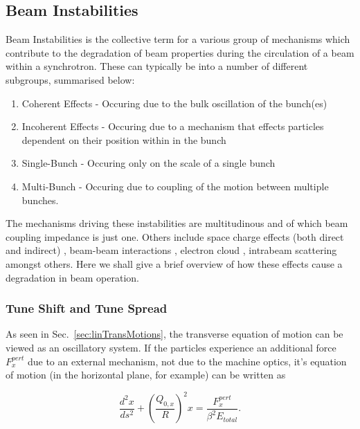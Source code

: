 \subsection{Beam Instabilities}

Beam Instabilities is the collective term for a various group of mechanisms which contribute to the degradation of beam properties during the circulation of a beam within a synchrotron. These can typically be into a number of different subgroups, summarised below:

\begin{enumerate}
\item{Coherent Effects - Occuring due to the bulk oscillation of the bunch(es)}
\item{Incoherent Effects - Occuring due to a mechanism that effects particles dependent on their position within in the bunch}
\item{Single-Bunch - Occuring only on the scale of a single bunch}
\item{Multi-Bunch - Occuring due to coupling of the motion between multiple bunches}.
\end{enumerate}

The mechanisms driving these instabilities are multitudinous and of which beam coupling impedance is just one. Others include space charge effects (both direct and indirect) \cite{Burov:TransInstabSC, Boine-Frankenheim:InstabSCRings}, beam-beam interactions \cite{Pieloni:PhDThesis}, electron cloud \cite{Li:ECloud}, intrabeam scattering \cite{Schaumann:IBS, Mertens:IBSThesis} amongst others. Here we shall give a brief overview of how these effects cause a degradation in beam operation.

\subsubsection{Tune Shift and Tune Spread} 

As seen in Sec.~\ref{sec:linTransMotions}, the transverse equation of motion can be viewed as an oscillatory system. If the particles experience an additional force $ F^{pert}_{x}$ due to an external mechanism, not due to the machine optics, it's equation of motion (in the horizontal plane, for example) can be written as

\begin{equation}
\frac{d^{2}x}{ds^{2}} + \left(\frac{Q_{0,x}}{R}\right)^{2} x = \frac{F^{pert}_{x}}{\beta^{2} E_{total}}.
\end{equation}

